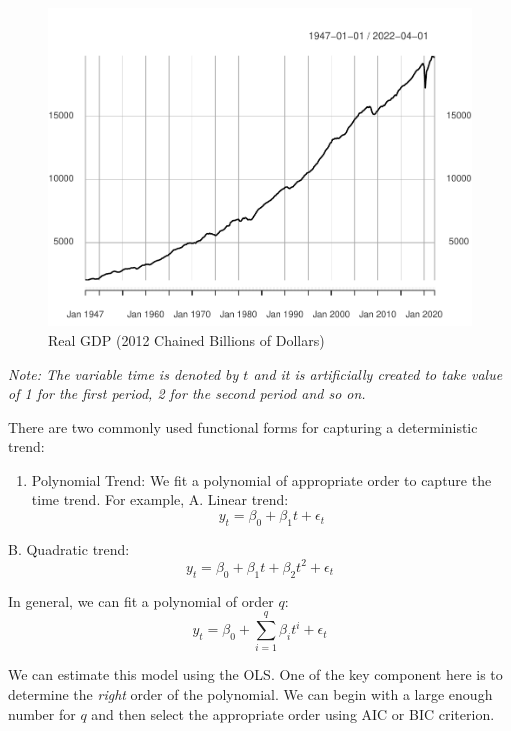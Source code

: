 \documentclass[]{book}
\providecommand{\tightlist}{%
  \setlength{\itemsep}{0pt}\setlength{\parskip}{0pt}}
\theoremstyle{definition}
\theoremstyle{definition}
\theoremstyle{definition}
\theoremstyle{remark}
\begin{document}
\begin{figure}

{\centering \includegraphics[width=0.8\linewidth]{bookdown-demo_files/figure-latex/ch5-figure1-1} 

}

\caption{Real GDP (2012 Chained Billions of Dollars)}\label{fig:ch5-figure1}
\end{figure}

\emph{Note: The variable time is denoted by \(t\) and it is artificially
created to take value of 1 for the first period, 2 for the second period
and so on.}

There are two commonly used functional forms for capturing a
deterministic trend:

\begin{enumerate}
\def\labelenumi{\arabic{enumi}.}
\tightlist
\item
  Polynomial Trend: We fit a polynomial of appropriate order to capture
  the time trend. For example, A. Linear trend: \begin{equation}
  y_t=\beta_0 +\beta_1 t +\epsilon_t
  \end{equation}
\end{enumerate}

B. Quadratic trend: \begin{equation}
y_t=\beta_0 +\beta_1 t + \beta_2 t^2 +\epsilon_t
\end{equation}

In general, we can fit a polynomial of order \(q\): \begin{equation}
y_t=\beta_0 + \sum_{i=1}^q \beta_i t^i +\epsilon_t
\end{equation}

We can estimate this model using the OLS. One of the key component here
is to determine the \emph{right} order of the polynomial. We can begin
with a large enough number for \(q\) and then select the appropriate
order using AIC or BIC criterion.
\end{document}
